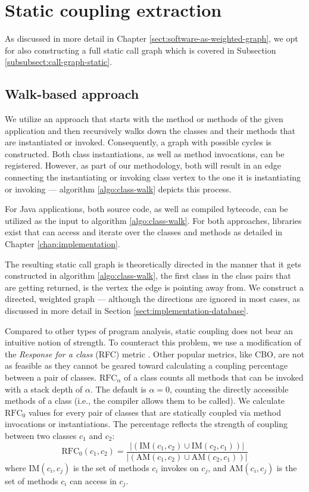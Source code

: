 \documentclass[12pt,a4paper]{report}
\begin{document}
\section{Static coupling extraction} \label{sect:static-coupling-extraction}

As discussed in more detail in Chapter \ref{sect:software-as-weighted-graph},
we opt for also constructing a full static call graph which is covered in
Subsection \ref{subsubsect:call-graph-static}.


\subsection{Walk\hyp based approach}

We utilize an approach that starts with the  method or methods of
the given application and then recursively walks down the classes and their
methods that are instantiated or invoked. Consequently, a graph with possible
cycles is constructed. Both class instantiations, as well as method
invocations, can be registered. However, as part of our methodology, both will
result in an edge connecting the instantiating or invoking class vertex to the
one it is instantiating or invoking --- algorithm \ref{algo:class-walk} depicts
this process.

For Java applications, both source code, as well as compiled bytecode, can be
utilized as the input to algorithm \ref{algo:class-walk}. For both approaches,
libraries exist that can access and iterate over the classes and methods as
detailed in Chapter \ref{chap:implementation}.

The resulting static call graph is theoretically directed in the manner that it
gets constructed in algorithm \ref{algo:class-walk}, the first class in the
class pairs that are getting returned, is the vertex the edge is pointing away
from. We construct a directed, weighted graph ---
although the directions are ignored in most cases, as discussed in
more detail in Section \ref{sect:implementation-database}.

Compared to other types of program analysis, static coupling does not bear an
intuitive notion of strength.
To counteract this problem, we use a modification of the
\textit{Response for a class} (RFC) metric \cite{briand1999unified}.
Other popular metrics, like CBO, are not as feasible
as they cannot be geared toward calculating a coupling percentage between
a pair of classes.
\(\text{RFC}_\alpha\) of a class counts all methods that can be invoked with
a stack depth of \(\alpha\). The default is \(\alpha = 0\),
counting the directly accessible methods of a class
(i.e., the compiler allows them to be called).
We calculate $\text{RFC}_0$ values for every pair of classes that are statically
coupled via method invocations or instantiations.
The percentage reflects the strength of coupling between two classes $c_1$ and $c_2$:
\[
  \text{RFC}_{0}(c_1, c_2) = \frac{\vert (\text{IM}(c_1, c_2) \cup \text{IM}(c_2, c_1)) \vert}{\vert (\text{AM}(c_1, c_2) \cup \text{AM}(c_2, c_1)) \vert}
\]
where \(\text{IM}(c_i, c_j)\) is the set of methods $c_i$ invokes on $c_j$,
and \(\text{AM}(c_i, c_j)\) is the set of methods $c_i$ can access in $c_j$.
\end{document}
